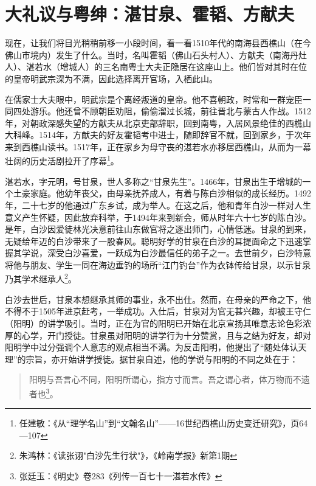 \section{大礼议与粤绅：湛甘泉、霍韬、方献夫}

\indent 现在，让我们将目光稍稍前移一小段时间，看一看1510年代的南海县西樵山（在今佛山市境内）发生了什么。当时，名叫霍韬（佛山石头村人）、方献夫（南海丹灶人）、湛若水（增城人）的三名南粤士大夫正隐居在这座山上。他们皆对其时在位的皇帝明武宗深为不满，因此选择离开官场，入栖此山。

在儒家士大夫眼中，明武宗是个离经叛道的皇帝。他不喜朝政，时常和一群宠臣一同四处游乐。他还曾不顾朝臣劝阻，偷偷溜过长城，前往晋北与蒙古人作战。1512年，对朝政深感失望的方献夫从北京吏部辞职，回到南粤，入居风景绝佳的西樵山大科峰。1514年，方献夫的好友霍韬考中进士，随即辞官不就，回到家乡，于次年来到西樵山读书。1517年，正在家乡为母守丧的湛若水亦移居西樵山，从而为一幕壮阔的历史活剧拉开了序幕\footnote{任建敏：《从“理学名山”到“文翰名山”——16世纪西樵山历史变迁研究》，页64—107}。

湛若水，字元明，号甘泉，世人多称之“甘泉先生”。1466年，甘泉出生于增城的一个土豪家庭。他幼年丧父，由母亲抚养成人，有着与陈白沙相似的成长经历。1492年，二十七岁的他通过广东乡试，成为举人。在这之后，他和青年白沙一样对人生意义产生怀疑，因此放弃科举，于1494年来到新会，师从时年六十七岁的陈白沙。是年，白沙因爱徒林光决意前往山东做官将之逐出师门，心情低迷。甘泉的到来，无疑给年迈的白沙带来了一股春风。聪明好学的甘泉在白沙的耳提面命之下迅速掌握其学说，深受白沙喜爱，一跃成为白沙最信任的弟子之一。去世前夕，白沙特意将他与朋友、学生一同在海边垂钓的场所“江门钓台”作为衣钵传给甘泉，以示甘泉乃其学术继承人\footnote{朱鸿林：《读张诩"白沙先生行状"》，《岭南学报》新第1期}。

白沙去世后，甘泉本想继承其师的事业，永不出仕。然而，在母亲的严命之下，他不得不于1505年进京赶考，一举成功。入仕后，甘泉对为官无甚兴趣，却被王守仁（阳明）的讲学吸引。当时，正在为官的阳明已开始在北京宣扬其唯意志论色彩浓厚的心学，开门授徒。甘泉虽对阳明的讲学行为十分赞赏，且与之结为好友，却对阳明学中过分强调个人意志的观点相当不满。为反击阳明，他提出了“随处体认天理”的宗旨，亦开始讲学授徒。据甘泉自述，他的学说与阳明的不同之处在于：

\begin{quote}

阳明与吾言心不同，阳明所谓心，指方寸而言。吾之谓心者，体万物而不遗者也\footnote{张廷玉：《明史》卷283《列传一百七十一湛若水传》}。

\end{quote}

